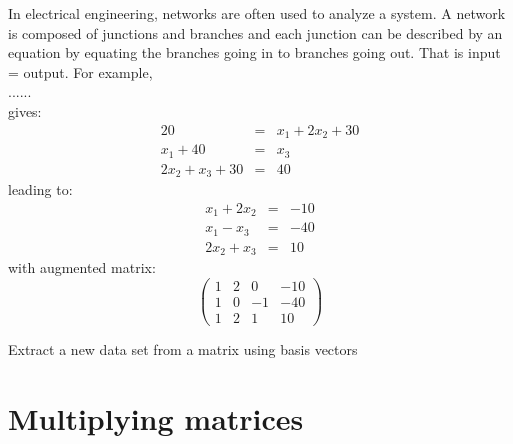 \documentclass{ximera}
\begin{document}
\begin{example}[Cryptography]
\end{example}





\begin{example}[Networks]
In electrical engineering, networks are often used to analyze a system. A network is composed of junctions and branches and each junction can be described by an equation by equating the branches going in to branches going out. That is input = output. For example,\\

......\\

gives:
\begin{eqnarray*}
20 &=& x_{1} + 2x_{2} + 30\\
x_{1} + 40 &=& x_{3}\\
2x_{2} + x_{3} + 30 &=& 40
\end{eqnarray*}
leading to:
\begin{eqnarray*}
x_{1}+2x_{2} &=& -10\\
x_{1} -x_{3}&=& -40\\
2x_{2} + x_{3}  &=& 10
\end{eqnarray*}
with augmented matrix:
\[\left(\begin{array}{ccc|c}
1 & 2 & 0 & -10\\
1 & 0 & -1 & -40\\
1 & 2 & 1 & 10
\end{array}\right)\]
\end{example}





\begin{example}
Extract a new data set from a matrix using basis vectors
\end{example}


\begin{example}
\end{example}





\section{Multiplying matrices}
\end{document}
